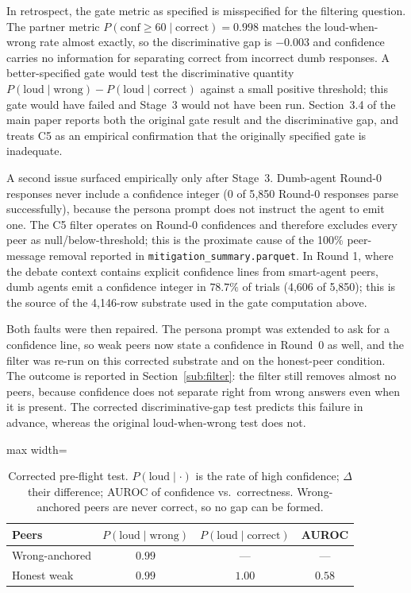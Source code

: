 \documentclass[11pt]{article}
\begin{document}
In retrospect, the gate metric as specified is misspecified for the
filtering question.
The partner metric $P(\text{conf} \geq 60 \mid \text{correct}) = 0.998$
matches the loud-when-wrong rate almost exactly, so the discriminative
gap is $-0.003$ and confidence carries no information for separating
correct from incorrect dumb responses.
A better-specified gate would test the discriminative quantity
$P(\text{loud}\mid\text{wrong}) - P(\text{loud}\mid\text{correct})$
against a small positive threshold; this gate would have failed and
Stage~3 would not have been run.
Section~3.4 of the main paper reports both the original gate result
and the discriminative gap, and treats C5 as an empirical
confirmation that the originally specified gate is inadequate.

A second issue surfaced empirically only after Stage~3.
Dumb-agent Round-0 responses never include a confidence integer (0 of
5{,}850 Round-0 responses parse successfully), because the persona
prompt does not instruct the agent to emit one.
The C5 filter operates on Round-0 confidences and therefore excludes
every peer as null/below-threshold; this is the proximate cause of the
100\% peer-message removal reported in
\texttt{mitigation\_summary.parquet}.
In Round 1, where the debate context contains explicit confidence
lines from smart-agent peers, dumb agents emit a confidence integer in
$78.7\%$ of trials (4{,}606 of 5{,}850); this is the source of the
4{,}146-row substrate used in the gate computation above.

Both faults were then repaired.
The persona prompt was extended to ask for a confidence line, so weak peers
now state a confidence in Round~0 as well, and the filter was re-run on
this corrected substrate and on the honest-peer condition.
The outcome is reported in Section~\ref{sub:filter}: the filter still
removes almost no peers, because confidence does not separate right from
wrong answers even when it is present.
The corrected discriminative-gap test predicts this failure in advance,
whereas the original loud-when-wrong test does not.

\begin{table}[h]
\centering
\small
\caption{Corrected pre-flight test. $P(\text{loud}\mid\cdot)$ is the rate of
high confidence; $\Delta$ their difference; AUROC of confidence vs.\
correctness. Wrong-anchored peers are never correct, so no gap can be
formed.\label{tab:gate}}
\begin{adjustbox}{max width=\linewidth}
\begin{tabular}{@{}lccc@{}}
\toprule
Peers & $P(\text{loud}\!\mid\!\text{wrong})$ & $P(\text{loud}\!\mid\!\text{correct})$ & AUROC \\
\midrule
Wrong-anchored & $0.99$ & --- & --- \\
Honest weak    & $0.99$ & $1.00$ & $0.58$ \\
\bottomrule
\end{tabular}
\end{adjustbox}
\end{table}
\end{document}
